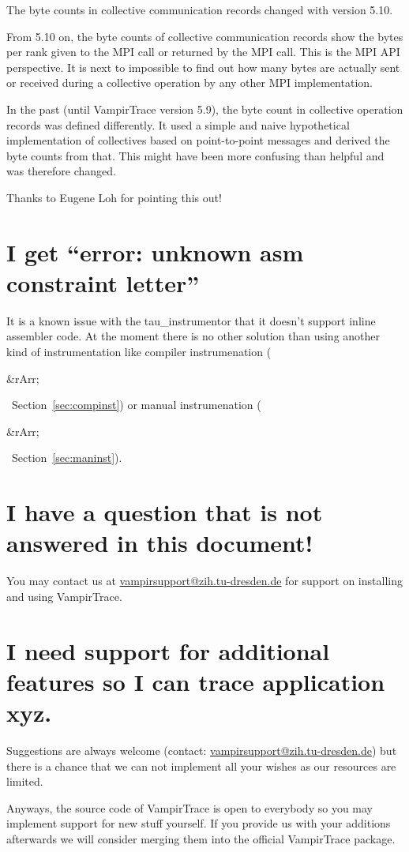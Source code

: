 \documentclass[a4paper,twoside,12pt,BCOR12mm]{scrbook}
\newcommand{\rarr}{$\Rightarrow$}  %
\renewcommand{\rarr}{\begin{rawhtml}&rArr;\end{rawhtml}}   %
\begin{document}
\begin{latexonly}
The byte counts in collective communication records changed with version 5.10.

From 5.10 on, the byte counts of collective communication records show the 
bytes per rank given to the MPI call or returned by the MPI call. 
This is the MPI API perspective. It is next to impossible to find out how many 
bytes are actually sent or received during a collective operation by any other 
MPI implementation.

In the past (until VampirTrace version 5.9), the byte count in collective 
operation records was defined differently. It used a simple and naive 
hypothetical implementation of collectives based on point-to-point messages 
and derived the byte counts from that. This might have been more confusing than
helpful and was therefore changed. 

Thanks to Eugene Loh for pointing this out!
 
\section{I get ``error: unknown asm constraint letter''}
\label{sec:faq_asm_error}

It is a known issue with the tau\_instrumentor that it doesn't support inline assembler code.
At the moment there is no other solution than using another kind of instrumentation like
compiler instrumenation (\rarr ~Section~\ref{sec:compinst}) or manual instrumenation (\rarr ~Section~\ref{sec:maninst}).

\section{I have a question that is not answered in this document!}
\label{sec:faq_unanswered}

You may contact us at \href{mailto:vampirsupport@zih.tu-dresden.de}{vampirsupport@zih.tu-dresden.de}
for support on installing and using VampirTrace.

\section{I need support for additional features so I can trace application xyz.}
\label{sec:faq_morefeatures}

Suggestions are always welcome (contact: \href{mailto:vampirsupport@zih.tu-dresden.de}{vampirsupport@zih.tu-dresden.de})
but there is a chance that we can not implement all your wishes as our resources
are limited.

Anyways, the source code of VampirTrace is open to everybody so you may
implement support for new stuff yourself.
If you provide us with your additions afterwards we will consider merging them
into the official VampirTrace package.
\end{latexonly}
\end{document}
